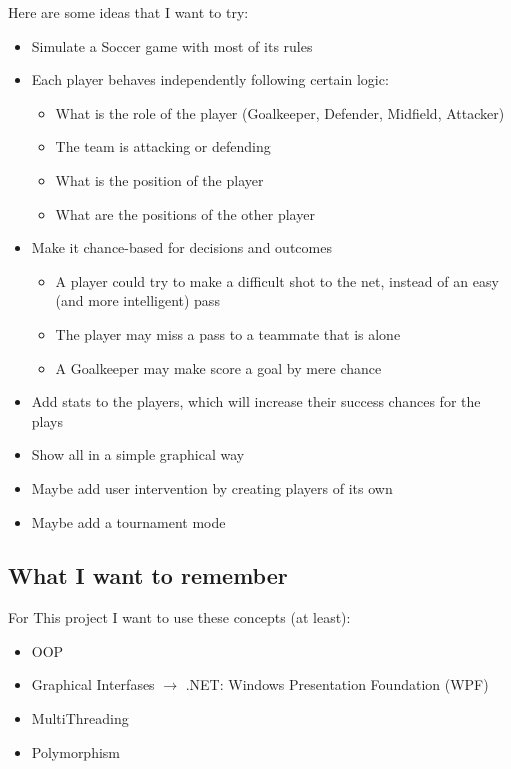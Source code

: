 \documentclass{article}
\theoremstyle{mytheoremstyle}
\theoremstyle{mytheoremstyle}
\theoremstyle{myproblemstyle}
\begin{document}
    Here are some ideas that I want to try:
    \begin{itemize}
        \item Simulate a Soccer game with most of its rules
        \item Each player behaves independently following certain logic:
        \begin{itemize}
            \item What is the role of the player (Goalkeeper, Defender, Midfield, Attacker)
            \item The team is attacking or defending
            \item What is the position of the player
            \item What are the positions of the other player 
        \end{itemize}
        \item Make it chance-based for decisions and outcomes
        \begin{itemize}
            \item A player could try to make a difficult shot to the net, instead of an easy (and more intelligent) pass
            \item The player may miss a pass to a teammate that is alone
            \item A Goalkeeper may make score a goal by mere chance
        \end{itemize}
        \item Add stats to the players, which will increase their success chances for the plays
        \item Show all in a simple graphical way
        \item Maybe add user intervention by creating players of its own
        \item Maybe add a tournament mode
    \end{itemize}

    \subsection{What I want to remember}
    For This project I want to use these concepts (at least):
    \begin{itemize}
        \item OOP
        \item Graphical Interfases $\rightarrow$ .NET: Windows Presentation Foundation (WPF)
        \item MultiThreading
        \item Polymorphism
    \end{itemize}
    
\end{document}
